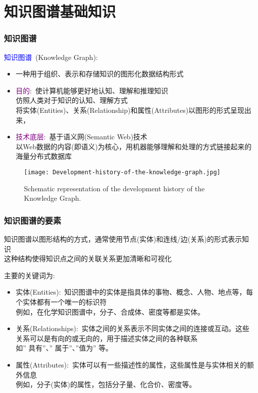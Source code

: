 \section{知识图谱基础知识}
\frame
{
	\frametitle{知识图谱}
	\textcolor{blue}{知识图谱}~\textrm{(Knowledge Graph)}:
	\begin{itemize}
		\item 一种用于组织、表示和存储知识的图形化数据结构形式
		\item \textcolor{purple}{目的}:~使计算机能够更好地认知、理解和推理知识\\
			仿照人类对于知识的认知、理解方式\\
			将实体\textrm{(Entities)}、关系\textrm{(Relationship)}和属性\textrm{(Attributes)}以图形的形式呈现出来，
		\item \textcolor{purple}{技术底层}:~基于语义网\textrm{(Semantic Web)}技术\\
			以\textrm{Web}数据的内容(即语义)为核心，用机器能够理解和处理的方式链接起来的海量分布式数据库
	\end{itemize}
\begin{figure}[h!]
\centering
\vskip -8pt
\texttt{[image: Development-history-of-the-knowledge-graph.jpg]}
\caption{\tiny\textrm{Schematic representation of the development history of the Knowledge Graph.}}%
\label{Fig:Knowledge-history}
\end{figure}
}

\frame
{
	\frametitle{知识图谱的要素}
知识图谱以图形结构的方式，通常使用节点(实体)和连线/边(关系)的形式表示知识\\
这种结构使得知识点之间的关联关系更加清晰和可视化

主要的关键词为:
\begin{itemize}
	\item 实体\textrm{(Entities)}:~知识图谱中的实体是指具体的事物、概念、人物、地点等，每个实体都有一个唯一的标识符\\
		例如，在化学知识图谱中，分子、合成体、密度等都是实体。
	\item 关系\textrm{(Relationships)}:~实体之间的关系表示不同实体之间的连接或互动。这些关系可以是有向的或无向的，用于描述实体之间的各种联系\\
		如” 具有”、” 属于”、”值为” 等。
	\item 属性\textrm{(Attributes)}:~实体可以有一些描述性的属性，这些属性是与实体相关的额外信息\\
		例如，分子(实体)的属性，包括分子量、化合价、密度等。
\end{itemize}
}

